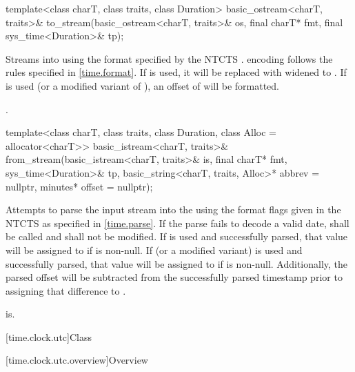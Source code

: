 %
\begin{itemdecl}
template<class charT, class traits, class Duration>
  basic_ostream<charT, traits>&
    to_stream(basic_ostream<charT, traits>& os, final charT* fmt, final sys_time<Duration>& tp);
\end{itemdecl}

\begin{itemdescr}
\pnum
\effects
Streams  into  using
the format specified by the NTCTS .
 encoding follows the rules specified in \ref{time.format}.
If  is used, it will be replaced with
 widened to .
If  is used (or a modified variant of ),
an offset of  will be formatted.

\pnum
\returns {}.
\end{itemdescr}

%
\begin{itemdecl}
template<class charT, class traits, class Duration, class Alloc = allocator<charT>>
  basic_istream<charT, traits>&
    from_stream(basic_istream<charT, traits>& is, final charT* fmt,
                sys_time<Duration>& tp, basic_string<charT, traits, Alloc>* abbrev = nullptr,
                minutes* offset = nullptr);
\end{itemdecl}

\begin{itemdescr}
\pnum
\effects Attempts to parse the input stream 
into the   using
the format flags given in the NTCTS 
as specified in \ref{time.parse}.
If the parse fails to decode a valid date,
shall be called and  shall not be modified.
If  is used and successfully parsed,
that value will be assigned to  if  is non-null.
If  (or a modified variant) is used and successfully parsed,
that value will be assigned to  if  is non-null.
Additionally, the parsed offset will be subtracted
from the successfully parsed timestamp
prior to assigning that difference to .

\pnum
\returns is.
\end{itemdescr}

[time.clock.utc]{Class }

[time.clock.utc.overview]{Overview}
%

